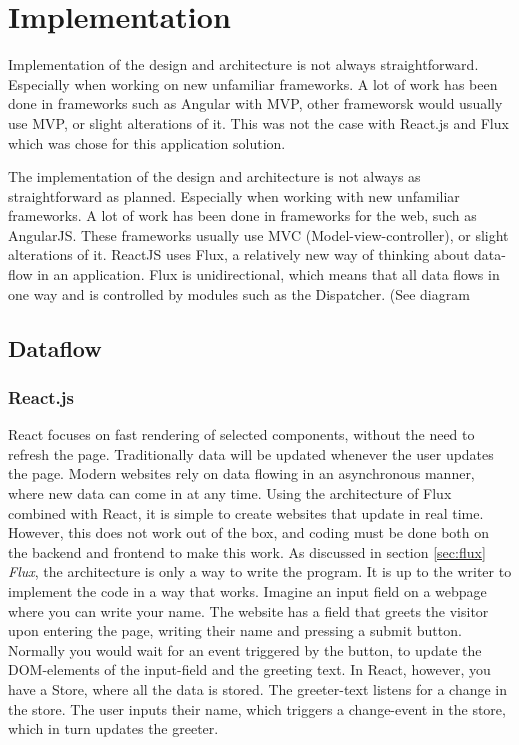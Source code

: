 \chapter{Implementation}
Implementation of the design and architecture is not always straightforward. Especially when working on new unfamiliar frameworks. A lot of work has been done in frameworks such as Angular with MVP, other frameworsk would usually use MVP, or slight alterations of it. This was not the case with React.js and Flux which was chose for this application solution.

The implementation of the design and architecture is not always as straightforward as planned. Especially when working with new unfamiliar frameworks. A lot of work has been done in frameworks for the web, such as AngularJS. These frameworks usually use MVC (Model-view-controller), or slight alterations of it. ReactJS uses Flux, a relatively new way of thinking about data-flow in an application. Flux is unidirectional, which means that all data flows in one way and is controlled by modules such as the Dispatcher. (See diagram 



\section{Dataflow}
\subsection{React.js}

React focuses on fast rendering of selected components, without the need to refresh the page. Traditionally data will be updated whenever the user updates the page. Modern websites rely on data flowing in an asynchronous manner, where new data can come in at any time. Using the architecture of Flux combined with React, it is simple to create websites that update in real time. However, this does not work out of the box, and coding must be done both on the backend and frontend to make this work. As discussed in section \ref{sec:flux} \emph{Flux}, the architecture is only a way to write the program. It is up to the writer to implement the code in a way that works. Imagine an input field on a webpage where you can write your name. The website has a field that greets the visitor upon entering the page, writing their name and pressing a submit button. Normally you would wait for an event triggered by the button, to update the DOM-elements of the input-field and the greeting text. In React, however, you have a Store, where all the data is stored. The greeter-text listens for a change in the store. The user inputs their name, which triggers a change-event in the store, which in turn updates the greeter.

